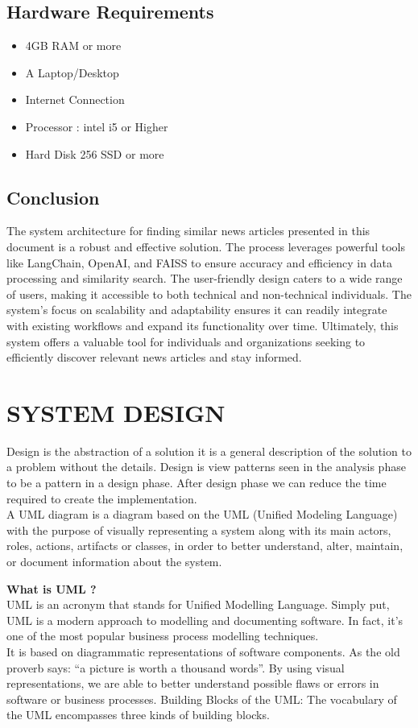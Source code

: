 \documentclass[12pt,a4paper]{report}
\begin{document}
{\section{Hardware Requirements}
\begin{itemize}
    \item 4GB RAM or more
    \item A Laptop/Desktop
    \item Internet Connection
    \item Processor : intel i5 or Higher
    \item Hard Disk 256 SSD or more
\end{itemize}
\section{Conclusion}
The system architecture for finding similar news articles presented in this document is a robust and effective solution. The process leverages powerful tools like LangChain, OpenAI, and FAISS to ensure accuracy and efficiency in data processing and similarity search. The user-friendly design caters to a wide range of users, making it accessible to both technical and non-technical individuals. The system's focus on scalability and adaptability ensures it can readily integrate with existing workflows and expand its functionality over time. Ultimately, this system offers a valuable tool for individuals and organizations seeking to efficiently discover relevant news articles and stay informed.

\newpage
\chapter{SYSTEM DESIGN}

Design is the abstraction of a solution it is a general description of the solution to a problem without the details. Design is view patterns seen in the analysis phase to be a pattern in a design phase. After design phase we can reduce the time required to create the implementation.\\
\hspace*{35pt}A UML diagram is a diagram based on the UML (Unified Modeling Language) with the purpose of visually representing a system along with its main actors, roles, actions, artifacts or classes, in order to better understand, alter, maintain, or document information about the system.


\textbf{What is UML ?}\\UML is an acronym that stands for Unified Modelling Language. Simply put, UML is a modern approach to modelling and documenting software. In fact, it’s one of the most popular business process modelling techniques.\\
\hspace*{35pt}It is based on diagrammatic representations of software components. As the old proverb says: “a picture is worth a thousand words”. By using visual representations, we are able to better understand possible flaws or errors in software or business processes. Building Blocks of the UML: The vocabulary of the UML encompasses three kinds of building blocks.


}
\end{document}
